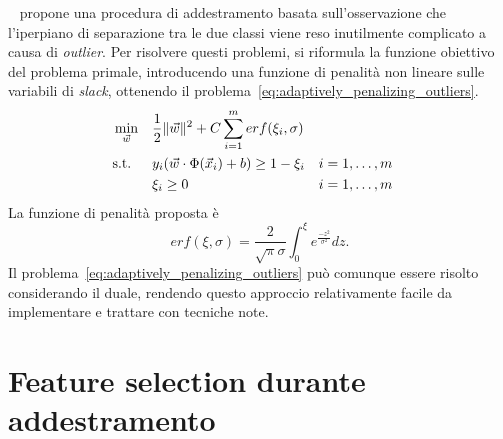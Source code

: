 ~\cite{2005_penalizing_outliers} propone una procedura di addestramento basata sull'osservazione che l'iperpiano di separazione tra le due classi viene reso inutilmente complicato a causa di \emph{outlier}. Per risolvere questi problemi, si riformula la funzione obiettivo del problema primale, introducendo una funzione di penalità non lineare sulle variabili di \emph{slack}, ottenendo il problema~\cref{eq:adaptively_penalizing_outliers}.
\begin{equation}\label{eq:adaptively_penalizing_outliers}
\begin{aligned}
& \min_{\Vec{w}}    && \frac{1}{2}\|\Vec{w}\|^2 +C \sum_{i=1}^{m}erf(\xi_i, \sigma) \\
& \textrm{s.t.}     && y_i(\Vec{w}\cdot\Phi(\Vec{x}_i) + b) \geq 1 -\xi_i && i=1,\dots,m\\
&                   && \xi_i \geq 0  && i=1,\dots,m 
\end{aligned}
\end{equation}
La funzione di penalità proposta è 
\[
erf(\xi, \sigma) = \frac{2}{\sqrt{\pi}\sigma} \int_{0}^{\xi}e^{\frac{-z^2}{\sigma^2}} dz.
\]
%
Il problema~\cref{eq:adaptively_penalizing_outliers} può comunque essere risolto considerando il duale, rendendo questo approccio relativamente facile da implementare e trattare con tecniche note.


\cite{2006_svm_on_a_budget}



\section{Feature selection durante addestramento}



